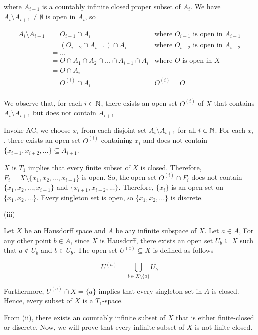 \documentclass{article}
\begin{document}
where $A_{i+1}$ is a countably infinite closed proper subset of $A_i$. We have $A_i \setminus A_{i+1} \neq \emptyset$ is open in $A_i$, so

\begin{align*}
    A_i \setminus A_{i+1}
        &= O_{i-1} \cap A_i &\text{where $O_{i-1}$ is open in $A_{i-1}$} \\
        &= (O_{i-2} \cap A_{i-1}) \cap A_i &\text{where $O_{i-2}$ is open in $A_{i-2}$} \\
        &= ... \\
        &= O \cap A_1 \cap A_2 \cap ... \cap A_{i-1} \cap A_i &\text{where $O$ is open in $X$} \\
        &= O \cap A_i \\
        &= O^{(i)} \cap A_i &\text{$O^{(i)} = O$}\\
\end{align*}

We observe that, for each $i \in \mathbb{N}$, there exists an open set $O^{(i)}$ of $X$ that contains $A_i \setminus A_{i+1}$ but does not contain $A_{i+1}$

Invoke AC, we choose $x_i$ from each disjoint set $A_i \setminus A_{i+1}$ for all $i \in \mathbb{N}$. For each $x_i$, there exists an open set $O^{(i)}$ containing $x_i$ and does not contain $\{x_{i+1}, x_{i+2}, ...\} \subseteq A_{i+1}$.

$X$ is $T_1$ implies that every finite subset of $X$ is closed. Therefore, $F_i = X \setminus \{x_1, x_2, ..., x_{i-1}\}$ is open. So, the open set $O^{(i)} \cap F_i$ does not contain $\{x_1, x_2, ..., x_{i-1}\}$ and $\{x_{i+1}, x_{i+2}, ... \}$. Therefore, $\{ x_i \}$ is an open set on $\{x_1, x_2, ... \}$. Every singleton set is open, so $\{x_1, x_2, ... \}$ is discrete.


(iii)

Let $X$ be an Hausdorff space and $A$ be any infinite subspace of $X$. Let $a \in A$, For any other point $b \in A$, since $X$ is Hausdorff, there exists an open set $U_b \subseteq X$ such that $a \notin U_b$ and $b \in U_b$. The open set $U^{(a)} \subseteq X$ is defined as follows

$$
    U^{(a)} = \bigcup_{b \in X \setminus \{ a \}} U_b
$$

Furthermore, $U^{(a)} \cap X = \{ a \}$ implies that every singleton set in $A$ is closed. Hence, every subset of $X$ is a $T_1$-space.

From (ii), there exists an countably infinite subset of $X$ that is either finite-closed or discrete. Now, we will prove that every infinite subset of $X$ is not finite-closed.
\end{document}
